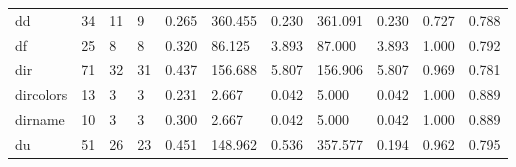 \begin{longtable}{lp{1.8cm}p{1.8cm}p{1.8cm}p{1.8cm}p{1.8cm}p{1.8cm}p{1.8cm}p{1.8cm}p{1.8cm}p{1.8cm}}
dd        &                           34 &                 11 &                                 9 &                                      0.265 &                                360.455 &                                        0.230 &                           361.091 &                                   0.230 &                              0.727 &                                              0.788 \\
df        &                           25 &                  8 &                                 8 &                                      0.320 &                                 86.125 &                                        3.893 &                            87.000 &                                   3.893 &                              1.000 &                                              0.792 \\
dir       &                           71 &                 32 &                                31 &                                      0.437 &                                156.688 &                                        5.807 &                           156.906 &                                   5.807 &                              0.969 &                                              0.781 \\
dircolors &                           13 &                  3 &                                 3 &                                      0.231 &                                  2.667 &                                        0.042 &                             5.000 &                                   0.042 &                              1.000 &                                              0.889 \\
dirname   &                           10 &                  3 &                                 3 &                                      0.300 &                                  2.667 &                                        0.042 &                             5.000 &                                   0.042 &                              1.000 &                                              0.889 \\
du        &                           51 &                 26 &                                23 &                                      0.451 &                                148.962 &                                        0.536 &                           357.577 &                                   0.194 &                              0.962 &                                              0.795 \\

\end{longtable}
